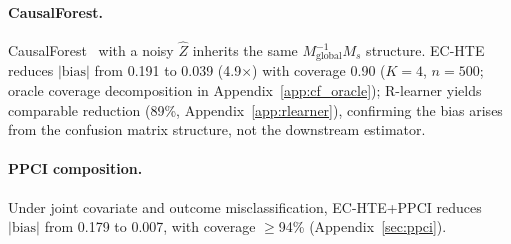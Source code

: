 \paragraph{CausalForest.}
CausalForest~\cite{wager2018causal} with a noisy $\hat{Z}$ inherits the same $M_{\text{global}}^{-1} M_s$ structure.
EC-HTE reduces $|\text{bias}|$ from 0.191 to 0.039 (4.9$\times$) with coverage 0.90 ($K{=}4$, $n{=}500$; oracle coverage decomposition in Appendix~\ref{app:cf_oracle}); R-learner yields comparable reduction (89\%, Appendix~\ref{app:rlearner}), confirming the bias arises from the confusion matrix structure, not the downstream estimator.

\paragraph{PPCI composition.}
Under joint covariate and outcome misclassification, EC-HTE+PPCI reduces $|\text{bias}|$ from 0.179 to 0.007, with coverage $\geq$94\% (Appendix~\ref{sec:ppci}).


